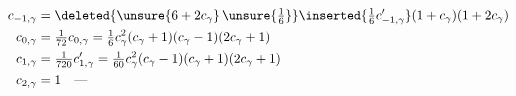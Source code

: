\[
\begin{aligned}
 c_{-1,\gamma}&=\deleted{\unsure{6+2c_\gamma}\,\unsure{\tfrac16}}\inserted{\tfrac16c'_{-1,\gamma}}(1+c_\gamma)(1+2c_\gamma)\\
 c_{0,\gamma}&=\tfrac1{72}c_{0,\gamma}=\tfrac16c_\gamma^2(c_\gamma+1)(c_\gamma-1)(2c_\gamma+1)\\
 c_{1,\gamma}&=\tfrac1{720}c'_{1,\gamma}=\tfrac1{60}c_\gamma^2(c_\gamma-1)(c_\gamma+1)(2c_\gamma+1)\\
 c_{2,\gamma}&=1\quad\text{---}
\end{aligned}
\]


